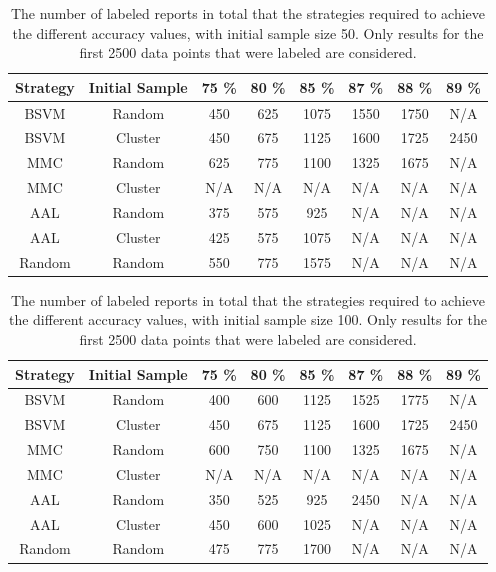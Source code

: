 \begin{table}
    \centering
    \begin{tabular}{|cccccccc|}
        \hline
        \textbf{Strategy} & \textbf{Initial Sample} & \textbf{75 \%} & \textbf{80 \%} & \textbf{85 \%} & \textbf{87 \%} & \textbf{88 \%} & \textbf{89 \%}\\
        \hline
        BSVM & Random & 450 & 625 & 1075 & 1550 & 1750 & N/A\\
        BSVM & Cluster & 450 & 675 & 1125 & 1600 & 1725 & 2450\\
        MMC & Random & 625 & 775 & 1100 & 1325 & 1675 & N/A\\
        MMC & Cluster & N/A & N/A & N/A & N/A & N/A & N/A\\
        AAL & Random & 375 & 575 & 925 & N/A & N/A & N/A\\
        AAL & Cluster & 425 & 575 & 1075 & N/A & N/A & N/A\\
        Random & Random & 550 & 775 & 1575 & N/A & N/A & N/A\\
        \hline
    \end{tabular}
    \caption{The number of labeled reports in total that the strategies required to achieve the different accuracy values, with initial sample size 50. Only results for the first 2500 data points that were labeled are considered.}
    \label{tab:active-learning-accuracy-50}
\end{table}

\begin{table}
    \centering
    \begin{tabular}{|cccccccc|}
        \hline
        \textbf{Strategy} & \textbf{Initial Sample} & \textbf{75 \%} & \textbf{80 \%} & \textbf{85 \%} & \textbf{87 \%} & \textbf{88 \%} & \textbf{89 \%}\\
        \hline
        BSVM & Random & 400 & 600 & 1125 & 1525 & 1775 & N/A\\
        BSVM & Cluster & 450 & 675 & 1125 & 1600 & 1725 & 2450\\
        MMC & Random & 600 & 750 & 1100 & 1325 & 1675 & N/A\\
        MMC & Cluster & N/A & N/A & N/A & N/A & N/A & N/A\\
        AAL & Random & 350 & 525 & 925 & 2450 & N/A & N/A\\
        AAL & Cluster & 450 & 600 & 1025 & N/A & N/A & N/A\\
        Random & Random & 475 & 775 & 1700 & N/A & N/A & N/A\\
        \hline
    \end{tabular}
    \caption{The number of labeled reports in total that the strategies required to achieve the different accuracy values, with initial sample size 100. Only results for the first 2500 data points that were labeled are considered.}
    \label{tab:active-learning-accuracy-100}
\end{table}

